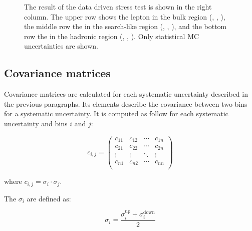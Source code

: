 \begin{figure}[htbp]
{  The result of the data driven stress test is shown in the right column.
  The upper row shows the lepton \pt in the bulk region
  (\protect{}, \protect{}, 
  \protect{}),
  the middle row the \mtblmin in the search-like region (\protect{}, \protect{}, \protect{}),
  and the bottom row the \mbWminimax in the hadronic \Wboson region (\protect{}, 
  \protect{}, \protect{}). 
  Only statistical MC uncertainties are shown.}%
  \label{fig:stress_test_data}
\end{figure}

\subsection{Covariance matrices}%
\label{sec:covariance-matrices}
Covariance matrices are calculated for each systematic uncertainty described in the previous paragraphs. Its elements describe the covariance between two bins for a systematic uncertainty. It is computed as follow for each systematic uncertainty and bins \(i\) and \(j\):

\begin{equation}
    c_{i,j} =
    \begin{pmatrix}
    c_{11} & c_{12} & \cdots & c_{1n} \\
    c_{21} & c_{22} & \cdots & c_{2n} \\
    \vdots & \vdots & \ddots & \vdots \\
    c_{n1} & c_{n2} & \cdots & c_{nn} \\

    \end{pmatrix}
    \label{eq:cov_matrix}
\end{equation}

where \(c_{i,j} = \sigma_{i} \cdot \sigma_{j}\).

The \(\sigma_{i}\) are defined as:

\begin{equation}
    \sigma_{i} = \frac{\sigma^\mathrm{up}_{i} + \sigma^\mathrm{down}_{i} }{2}
    \label{eq:cov_sigma}
\end{equation}

